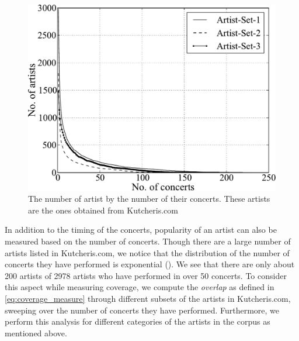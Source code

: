 \begin{figure}
	\begin{center}
		\includegraphics[width=\figSizeHundred]{ch04_datasets/figures/performances-vs-artists.pdf}
	\end{center}
	\caption{The number of artist by the number of their concerts. These artists are the ones obtained from Kutcheris.com}
	\label{fig:number_artrist_vs_number_concerts}
\end{figure}

In addition to the timing of the concerts, popularity of an artist can also be measured based on the number of concerts. Though there are a large number of artists listed in Kutcheris.com, we notice that the distribution of the number of concerts they have performed is exponential (). We see that there are only about 200 artists of 2978 artists who have performed in over 50 concerts. To consider this aspect while measuring coverage, we compute the \textit{overlap} as defined in \eqref{eq:coverage_measure} through different subsets of the artists in Kutcheris.com, sweeping over the number of concerts they have performed. Furthermore, we perform this analysis for different categories of the artists in the corpus as mentioned above.


